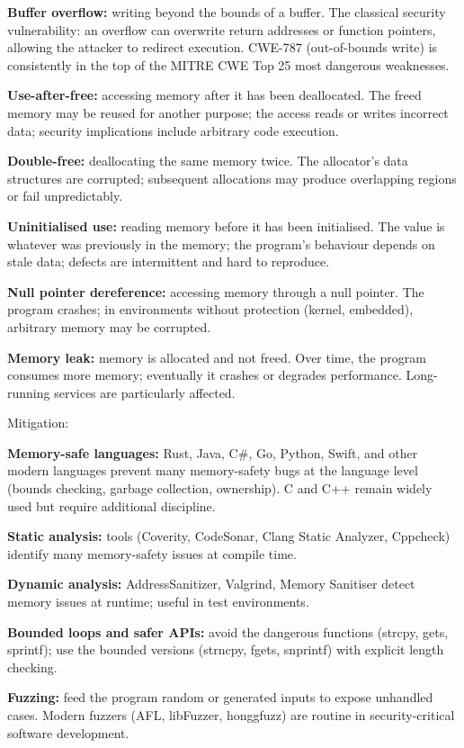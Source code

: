 \textbf{Buffer overflow:} writing beyond the bounds of a buffer. The classical security vulnerability: an overflow can overwrite return addresses or function pointers, allowing the attacker to redirect execution. CWE-787 (out-of-bounds write) is consistently in the top of the MITRE CWE Top 25 most dangerous weaknesses.

\textbf{Use-after-free:} accessing memory after it has been deallocated. The freed memory may be reused for another purpose; the access reads or writes incorrect data; security implications include arbitrary code execution.

\textbf{Double-free:} deallocating the same memory twice. The allocator's data structures are corrupted; subsequent allocations may produce overlapping regions or fail unpredictably.

\textbf{Uninitialised use:} reading memory before it has been initialised. The value is whatever was previously in the memory; the program's behaviour depends on stale data; defects are intermittent and hard to reproduce.

\textbf{Null pointer dereference:} accessing memory through a null pointer. The program crashes; in environments without protection (kernel, embedded), arbitrary memory may be corrupted.

\textbf{Memory leak:} memory is allocated and not freed. Over time, the program consumes more memory; eventually it crashes or degrades performance. Long-running services are particularly affected.

Mitigation:

\textbf{Memory-safe languages:} Rust, Java, C\#, Go, Python, Swift, and other modern languages prevent many memory-safety bugs at the language level (bounds checking, garbage collection, ownership). C and C++ remain widely used but require additional discipline.

\textbf{Static analysis:} tools (Coverity, CodeSonar, Clang Static Analyzer, Cppcheck) identify many memory-safety issues at compile time.

\textbf{Dynamic analysis:} AddressSanitizer, Valgrind, Memory Sanitiser detect memory issues at runtime; useful in test environments.

\textbf{Bounded loops and safer APIs:} avoid the dangerous functions (strcpy, gets, sprintf); use the bounded versions (strncpy, fgets, snprintf) with explicit length checking.

\textbf{Fuzzing:} feed the program random or generated inputs to expose unhandled cases. Modern fuzzers (AFL, libFuzzer, honggfuzz) are routine in security-critical software development.

